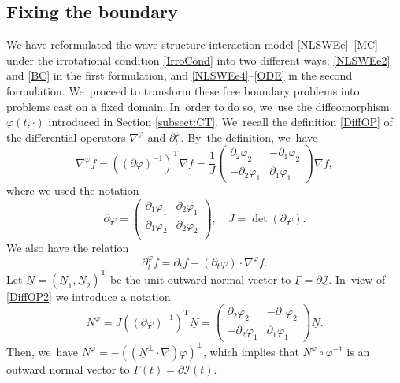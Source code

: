 \documentclass[11pt]{article}
\newcommand{\dt}{\partial_t}
\newcommand{\cI}{{\mathcal I}}
\newcommand{\ul}[1]{\underline{#1}}
\newcommand{\itGamma}{\mathit{\Gamma}}
\theoremstyle{definition}
\begin{document}
\subsection{Fixing the boundary}\label{sectfixing}
We have reformulated the wave-structure interaction model \eqref{NLSWEe}--\eqref{MC} under the irrotational condition \eqref{IrroCond} into two different ways;
\eqref{NLSWEe2} and \eqref{BC} in the first formulation, and \eqref{NLSWEe4}--\eqref{ODE} in the second formulation. We~proceed to transform these free boundary problems into problems cast on a fixed domain. In~order to do so, we~use the diffeomorphism $\varphi(t,\cdot)$ introduced in Section \ref{subsect:CT}. We~recall the definition \eqref{DiffOP} of the differential operators $\nabla^\varphi$ and $\dt^\varphi$. By~the definition, we~have
\begin{equation}\label{DiffOP2}
\nabla^\varphi f
= ((\partial\varphi)^{-1})^\mathrm{T}\nabla f
= \frac{1}{J}
\begin{pmatrix}
\partial_2\varphi_2 & -\partial_1\varphi_2 \\
-\partial_2\varphi_1 & \partial_1\varphi_1
\end{pmatrix}
\nabla f,
\end{equation}
where we used the notation
\[
\partial\varphi
= \begin{pmatrix}
\partial_1\varphi_1 & \partial_2\varphi_1 \\
\partial_1\varphi_2 & \partial_2\varphi_2 \\
\end{pmatrix}, \quad
J = \det(\partial\varphi).
\]
We also have the relation
\begin{equation}\label{DiffOP3}
\dt^\varphi f = \dt f - (\dt \varphi)\cdot\nabla^\varphi f.
\end{equation}
Let $\ul{N} = (\ul{N}_1,\ul{N}_2)^\mathrm{T}$ be the unit outward normal vector to $\ul{\itGamma}=\partial\ul{\cI}$. In~view of \eqref{DiffOP2} we introduce a notation
\begin{equation}\label{Nphi}
N^\varphi = J((\partial\varphi)^{-1})^\mathrm{T}\ul{N} =
\begin{pmatrix}
\partial_2\varphi_2 & -\partial_1\varphi_2 \\
-\partial_2\varphi_1 & \partial_1\varphi_1
\end{pmatrix}
\ul{N}.
\end{equation}
Then, we~have $N^\varphi = -((\ul{N}^{\perp}\cdot\nabla)\varphi)^\perp$,
which implies that $N^\varphi\circ\varphi^{-1}$ is an outward normal vector to $\itGamma(t)= \partial\cI(t)$.
\end{document}

